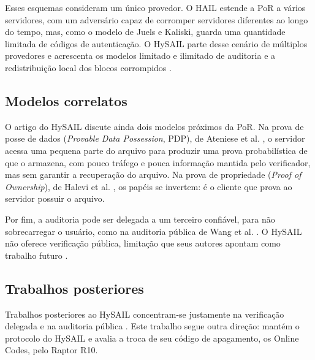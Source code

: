 Esses esquemas consideram um único provedor. O HAIL \cite{bowers2009hail} estende a \acrshort{PoR} a vários servidores, com um adversário capaz de corromper servidores diferentes ao longo do tempo, mas, como o modelo de Juels e Kaliski, guarda uma quantidade limitada de códigos de autenticação. O HySAIL parte desse cenário de múltiplos provedores e acrescenta os modelos limitado e ilimitado de auditoria e a redistribuição local dos blocos corrompidos \cite{amaral2019hysail}.

\subsection{Modelos correlatos}
\label{sec:relacionados_outros}

O artigo do HySAIL discute ainda dois modelos próximos da \acrshort{PoR}. Na prova de posse de dados (\emph{Provable Data Possession}, PDP), de Ateniese et al. \cite{ateniese2007pdp}, o servidor acessa uma pequena parte do arquivo para produzir uma prova probabilística de que o armazena, com pouco tráfego e pouca informação mantida pelo verificador, mas sem garantir a recuperação do arquivo. Na prova de propriedade (\emph{Proof of Ownership}), de Halevi et al. \cite{halevi2011pow}, os papéis se invertem: é o cliente que prova ao servidor possuir o arquivo.

Por fim, a auditoria pode ser delegada a um terceiro confiável, para não sobrecarregar o usuário, como na auditoria pública de Wang et al. \cite{wang2010privacy}. O HySAIL não oferece verificação pública, limitação que seus autores apontam como trabalho futuro \cite{amaral2019hysail}.

\subsection{Trabalhos posteriores}
\label{sec:relacionados_recentes}

Trabalhos posteriores ao HySAIL concentram-se justamente na verificação delegada e na auditoria pública \cite{armknecht2021outsourcing,tan2023proof,shen2024public}. Este trabalho segue outra direção: mantém o protocolo do HySAIL e avalia a troca de seu código de apagamento, os Online Codes, pelo Raptor R10.
